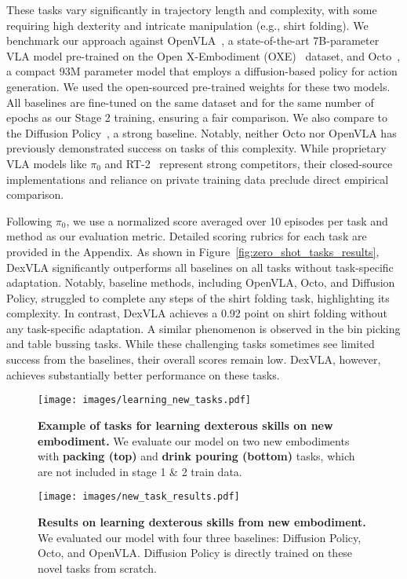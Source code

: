 These tasks vary significantly in trajectory length and complexity, with some requiring high dexterity and intricate manipulation (e.g., shirt folding). We benchmark our approach against OpenVLA~\cite{kim24openvla}, a state-of-the-art 7B-parameter VLA model pre-trained on the Open X-Embodiment (OXE)~\cite{o2023open-x} dataset, and Octo~\cite{octo}, a compact 93M parameter model that employs a diffusion-based policy for action generation. We used the open-sourced pre-trained weights for these two models. All baselines are fine-tuned on the same dataset and for the same number of epochs as our Stage 2 training, ensuring a fair comparison. We also compare to the Diffusion Policy~\cite{diffusion-policy}, a strong baseline. Notably, neither Octo nor OpenVLA has previously demonstrated success on tasks of this complexity. While proprietary VLA models like $\pi_{0}$ and RT-2~\cite{rt-2} represent strong competitors, their closed-source implementations and reliance on private training data preclude direct empirical comparison. 

Following $\pi_{0}$, we use a normalized score averaged over 10 episodes per task and method as our evaluation metric.  Detailed scoring rubrics for each task are provided in the Appendix. As shown in Figure~\ref{fig:zero_shot_tasks_results}, DexVLA significantly outperforms all baselines on all tasks without task-specific adaptation.  Notably, baseline methods, including OpenVLA, Octo, and Diffusion Policy, struggled to complete any steps of the shirt folding task, highlighting its complexity.  In contrast, DexVLA achieves a 0.92 point on shirt folding without any task-specific adaptation.  A similar phenomenon is observed in the bin picking and table bussing tasks.  While these challenging tasks sometimes see limited success from the baselines, their overall scores remain low. DexVLA, however, achieves substantially better performance on these tasks.


\begin{figure}[t]
    \centering
    \texttt{[image: images/learning\_new\_tasks.pdf]}
    \caption{\textbf{Example of tasks for learning dexterous skills on new embodiment.} We evaluate our model on two new embodiments with \textbf{packing (top)} and \textbf{drink pouring (bottom)} tasks, which are not included in stage 1 \& 2 train data.}\label{fig:new_task_suite}
\end{figure}



\begin{figure}[t]
    \centering
    \texttt{[image: images/new\_task\_results.pdf]}
    \caption{\textbf{Results on learning dexterous skills from new embodiment.} We evaluated our model with four three baselines: Diffusion Policy, Octo, and OpenVLA. Diffusion Policy is directly trained on these novel tasks from scratch.}\label{fig:new_tasks_results}
\end{figure}




